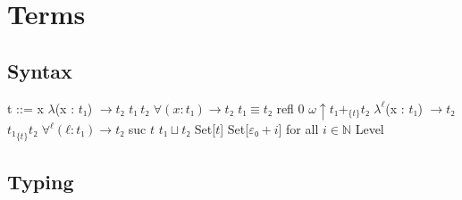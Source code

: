 \documentclass[runningheads,fleqn]{llncs}
\begin{document}
\section{Terms}

\subsection{Syntax}

\begin{grammar}
t ::= 
\alt x
\alt $λ$(x : $t₁$) $→ t₂$
\alt $t₁ \ t₂$
\alt $∀(x : t₁) → t₂$
\alt $t₁ ≡ t₂$
\alt refl
\alt $0$
\alt $ω ↑ t₁ +_{\{t\}} t₂$
\alt $λ^ℓ$(x : $t₁$) $→ t₂$
\alt $t₁ _{\{t\}} t₂$
\alt $∀^ℓ(ℓ : t₁) → t₂$
\alt suc $t$
\alt $t₁ ⊔ t₂$
\alt Set[$t$]
\alt Set[$ε₀+i$] for all $i ∈ ℕ$
\alt Level
\end{grammar}

\subsection{Typing}

\printbibliography{}
\end{document}
